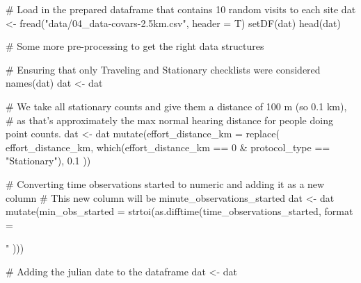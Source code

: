 \documentclass[]{article}
\newenvironment{Shaded}{}{}
\newcommand{\CommentTok}[1]{\textcolor[rgb]{0.00,0.50,0.00}{#1}}
\newcommand{\DataTypeTok}[1]{#1}
\newcommand{\DecValTok}[1]{#1}
\newcommand{\FloatTok}[1]{#1}
\newcommand{\KeywordTok}[1]{\textcolor[rgb]{0.00,0.00,1.00}{#1}}
\newcommand{\NormalTok}[1]{#1}
\newcommand{\OperatorTok}[1]{#1}
\newcommand{\StringTok}[1]{\textcolor[rgb]{0.00,0.50,0.50}{#1}}
\begin{document}
\begin{Shaded}
\begin{Highlighting}[numbers=left,,]
\CommentTok{# Load in the prepared dataframe that contains 10 random visits to each site}
\NormalTok{dat <-}\StringTok{ }\KeywordTok{fread}\NormalTok{(}\StringTok{"data/04_data-covars-2.5km.csv"}\NormalTok{, }\DataTypeTok{header =}\NormalTok{ T)}
\KeywordTok{setDF}\NormalTok{(dat)}
\KeywordTok{head}\NormalTok{(dat)}

\CommentTok{# Some more pre-processing to get the right data structures}

\CommentTok{# Ensuring that only Traveling and Stationary checklists were considered}
\KeywordTok{names}\NormalTok{(dat)}
\NormalTok{dat <-}\StringTok{ }\NormalTok{dat }\OperatorTok{%

\CommentTok{# We take all stationary counts and give them a distance of 100 m (so 0.1 km),}
\CommentTok{# as that's approximately the max normal hearing distance for people doing point counts.}
\NormalTok{dat <-}\StringTok{ }\NormalTok{dat }\OperatorTok{%
\StringTok{  }\KeywordTok{mutate}\NormalTok{(}\DataTypeTok{effort_distance_km =} \KeywordTok{replace}\NormalTok{(}
\NormalTok{    effort_distance_km,}
    \KeywordTok{which}\NormalTok{(effort_distance_km }\OperatorTok{==}\StringTok{ }\DecValTok{0} \OperatorTok{&}
\StringTok{      }\NormalTok{protocol_type }\OperatorTok{==}\StringTok{ "Stationary"}\NormalTok{),}
    \FloatTok{0.1}
\NormalTok{  ))}

\CommentTok{# Converting time observations started to numeric and adding it as a new column}
\CommentTok{# This new column will be minute_observations_started}
\NormalTok{dat <-}\StringTok{ }\NormalTok{dat }\OperatorTok{%
\StringTok{  }\KeywordTok{mutate}\NormalTok{(}\DataTypeTok{min_obs_started =} \KeywordTok{strtoi}\NormalTok{(}\KeywordTok{as.difftime}\NormalTok{(time_observations_started,}
    \DataTypeTok{format =} \StringTok{"%
\NormalTok{  )))}

\CommentTok{# Adding the julian date to the dataframe}
\NormalTok{dat <-}\StringTok{ }\NormalTok{dat }\OperatorTok{%

}}}}}
\end{Highlighting}
\end{Shaded}
\end{document}
